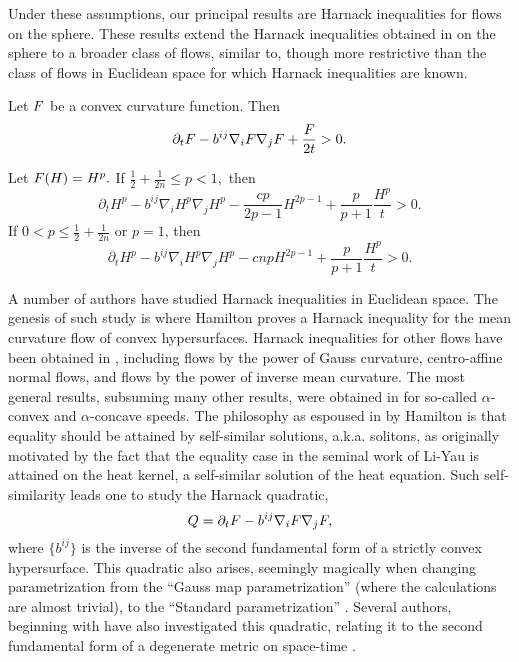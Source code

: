\documentclass{amsart}
\begin{document}
Under these assumptions, our principal results are Harnack inequalities for flows on the sphere. These results extend the Harnack inequalities obtained in \cite{BryanIvaki:08/2015,BryanLouie:02/2015} on the sphere to a broader class of flows, similar to, though more restrictive than the class of flows in Euclidean space \cite{Andrews:09/1994} for which Harnack inequalities are known.

\begin{theorem}\label{thm:harnack}
Let $F$ be a  convex curvature function. Then
\[
\partial_t F-b^{ij}\nabla_iF\nabla_jF+\frac{F}{2t}>0.
\]

Let $F(H)=H^{p}.$ If $\frac{1}{2}+\frac{1}{2n}\leq {p}< 1,$ then
\[
\partial_t H^{p} - b^{ij}\nabla_iH^{p}\nabla_jH^{p} - \frac{c {p}}{2{p}-1}H^{2{p}-1} + \frac{{p}}{{p}+1} \frac{H^{p}}{t} > 0.
\]
If $0<{p}\leq \frac{1}{2} + \frac{1}{2n}$ or $p=1$, then
\[
\partial_t H^{p} - b^{ij}\nabla_iH^{p}\nabla_jH^{p} - c n{p}H^{2{p}-1} + \frac{{p}}{{p}+1} \frac{H^{p}}{t} > 0.
\]
\end{theorem}

A number of authors have studied Harnack inequalities in Euclidean space. The genesis of such study is \cite{Hamilton:/1995} where Hamilton proves a Harnack inequality for the mean curvature flow of convex hypersurfaces. Harnack inequalities for other flows have been obtained in \cite{Chow:06/1991,Ivaki:11/2015,Ivaki:09/2015,Li:/2011,Smoczyk:/1997}, including flows by the power of Gauss curvature, centro-affine normal flows, and flows by the power of inverse mean curvature. The most general results, subsuming many other results, were obtained in \cite{Andrews:09/1994} for so-called \(\alpha\)-convex and \(\alpha\)-concave speeds. The philosophy as espoused in \cite{Hamilton:/1995} by Hamilton is that equality should be attained by self-similar solutions, a.k.a. solitons, as originally motivated by the fact that the equality case in the seminal work of Li-Yau \cite{LiYau:/1986} is attained on the heat kernel, a self-similar solution of the heat equation. Such self-similarity leads one to study the Harnack quadratic,
\begin{equation}
\label{eq:harnack_quadratic}
Q = \partial_t F - b^{ij} \nabla_i F \nabla_j F,
\end{equation}
where $\{b^{ij}\}$ is the inverse of the second fundamental form of a strictly convex hypersurface. This quadratic also arises, seemingly magically when changing parametrization from the ``Gauss map parametrization'' (where the calculations are almost trivial), to the ``Standard parametrization'' \cite{Andrews:09/1994}. Several authors, beginning with \cite{ChowChu:06/2001} have also investigated this quadratic, relating it to the second fundamental form of a degenerate metric on space-time \cite{HelmensdorferTopping:01/2013,Kotschwar:/2009}.
\end{document}
